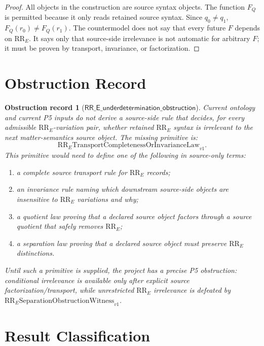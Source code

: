 \documentclass[11pt]{article}
\newcommand{\RRE}{\mathrm{RR}_E}
\newcommand{\RRUnder}{\mathsf{RR\_E\_underdetermination\_obstruction}}
\newcommand{\RRWitness}{\mathrm{RR}_{E}\mathrm{SeparationObstructionWitness}_{v1}}
\newcommand{\RRMissing}{\mathrm{RR}_{E}\mathrm{TransportCompletenessOrInvarianceLaw}_{v1}}
\newtheorem{obstruction}{Obstruction record}
\begin{document}
\begin{proof}
All objects in the construction are source syntax objects. The function
\(F_Q\) is permitted because it only reads retained source syntax. Since
\(q_0\ne q_1\), \(F_Q(r_0)\ne F_Q(r_1)\). The countermodel does not say that
every future \(F\) depends on \(\RRE\). It says only that source-side
irrelevance is not automatic for arbitrary \(F\); it must be proven by
transport, invariance, or factorization.
\end{proof}

\section{Obstruction Record}

\begin{obstruction}[\(\RRUnder\)]
Current ontology and current P5 inputs do not derive a source-side rule that
decides, for every admissible \(\RRE\)-variation pair, whether retained
\(\RRE\) syntax is irrelevant to the next matter-semantics source object.
The missing primitive is:
\[
  \RRMissing.
\]
This primitive would need to define one of the following in source-only terms:
\begin{enumerate}[label=M\arabic*.,leftmargin=*]
  \item a complete source transport rule for \(\RRE\) records;
  \item an invariance rule naming which downstream source-side objects are
  insensitive to \(\RRE\) variations and why;
  \item a quotient law proving that a declared source object factors through a
  source quotient that safely removes \(\RRE\);
  \item a separation law proving that a declared source object must preserve
  \(\RRE\) distinctions.
\end{enumerate}
Until such a primitive is supplied, the project has a precise P5 obstruction:
conditional irrelevance is available only after explicit source
factorization/transport, while unrestricted \(\RRE\) irrelevance is defeated
by \(\RRWitness\).
\end{obstruction}

\section{Result Classification}
\end{document}
